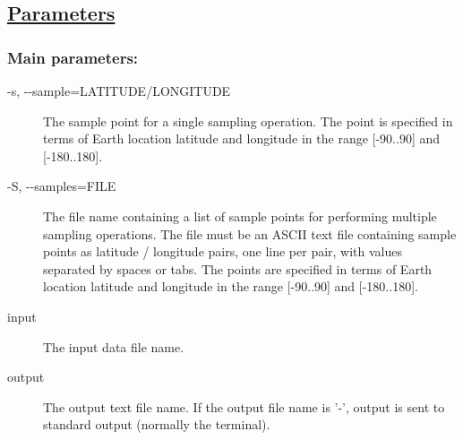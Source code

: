 \subsection*{\underline{Parameters}}
\subsubsection*{Main parameters:}
\begin{description}
\item[ -s, -{-}sample=LATITUDE/LONGITUDE ] The sample point for a single sampling operation. The point is specified in terms of Earth location latitude and longitude in the range [-90..90] and [-180..180]. 
\item[ -S, -{-}samples=FILE ] The file name containing a list of sample points for performing multiple sampling operations. The file must be an ASCII text file containing sample points as latitude / longitude pairs, one line per pair, with values separated by spaces or tabs. The points are specified in terms of Earth location latitude and longitude in the range [-90..90] and [-180..180]. 
\item[ input ] The input data file name. 
\item[ output ] The output text file name. If the output file name is '-', output is sent to standard output (normally the terminal). 

\end{description}
